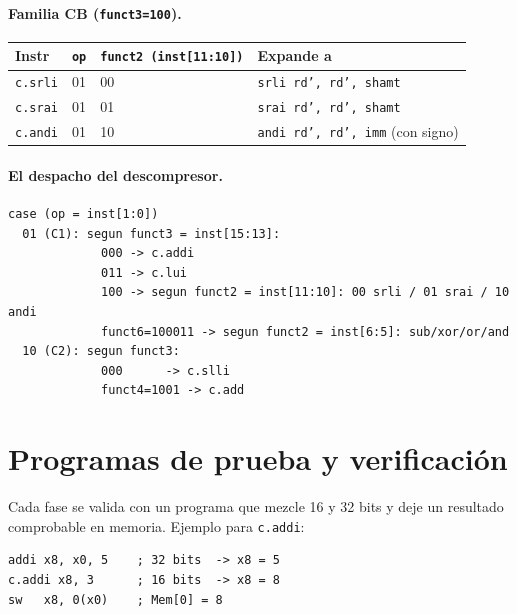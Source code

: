 \documentclass[11pt]{article}
\newcommand{\code}[1]{\texttt{#1}}
\begin{document}
\paragraph{Familia CB (\code{funct3=100}).}
\begin{center}
\small
\begin{tabular}{@{}llll@{}}
\toprule
Instr & \code{op} & \code{funct2 (inst[11:10])} & Expande a \\
\midrule
\code{c.srli} & 01 & 00 & \code{srli rd', rd', shamt} \\
\code{c.srai} & 01 & 01 & \code{srai rd', rd', shamt} \\
\code{c.andi} & 01 & 10 & \code{andi rd', rd', imm} (con signo) \\
\bottomrule
\end{tabular}
\end{center}

\paragraph{El despacho del descompresor.}
\begin{center}
\begin{minipage}{0.9\linewidth}
\begin{verbatim}
case (op = inst[1:0])
  01 (C1): segun funct3 = inst[15:13]:
             000 -> c.addi
             011 -> c.lui
             100 -> segun funct2 = inst[11:10]: 00 srli / 01 srai / 10 andi
             funct6=100011 -> segun funct2 = inst[6:5]: sub/xor/or/and
  10 (C2): segun funct3:
             000      -> c.slli
             funct4=1001 -> c.add
\end{verbatim}
\end{minipage}
\end{center}

\section{Programas de prueba y verificación}

Cada fase se valida con un programa que mezcle 16 y 32 bits y deje un resultado
comprobable en memoria. Ejemplo para \code{c.addi}:

\begin{center}
\begin{minipage}{0.7\linewidth}
\begin{verbatim}
addi x8, x0, 5    ; 32 bits  -> x8 = 5
c.addi x8, 3      ; 16 bits  -> x8 = 8
sw   x8, 0(x0)    ; Mem[0] = 8
\end{verbatim}
\end{minipage}
\end{center}
\end{document}
